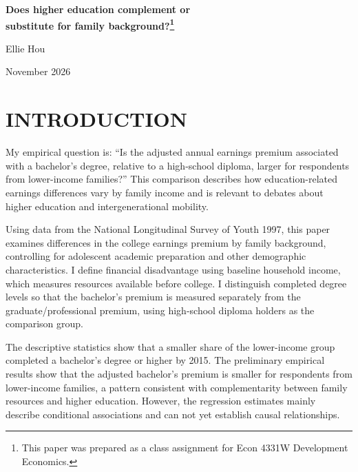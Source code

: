 \documentclass[12pt,letterpaper]{article}
\begin{document}
\hypersetup{pageanchor=false}
\begin{titlepage}
    \centering
    \singlespacing
    \renewcommand{\thefootnote}{\fnsymbol{footnote}}
    \vspace*{1.5in}

    {\Large\bfseries Does higher education complement or\\
    substitute for family background?\footnote{\normalfont This paper was prepared as a class assignment for Econ 4331W Development Economics.}\par}
    \vspace{\baselineskip}
    Ellie Hou\par
    November 2026\par

    \vfill
\end{titlepage}
\setcounter{footnote}{0}
\hypersetup{pageanchor=true}

\singlespacing
\raggedright

\section*{INTRODUCTION}
My empirical question is: ``Is the adjusted annual earnings premium associated with
a bachelor's degree, relative to a high-school diploma, larger for respondents
from lower-income families?'' This comparison describes how education-related
earnings differences vary by family income and is relevant to debates about higher
education and intergenerational mobility. \newline

Using data from the National Longitudinal Survey of Youth 1997, this paper examines differences
in the college earnings premium by family background, controlling for adolescent academic
preparation and other demographic characteristics. I define financial disadvantage using 
baseline household income, which measures resources available before college. 
I distinguish completed degree levels so that the bachelor's premium is measured separately 
from the graduate/professional premium, using high-school diploma holders as the comparison group.\newline

The descriptive statistics show that a smaller share of the lower-income group completed
a bachelor's degree or higher by 2015. The preliminary empirical results show that the 
adjusted bachelor's premium is smaller for respondents from lower-income families, a pattern 
consistent with complementarity between family resources and higher education.
However, the regression estimates mainly describe conditional associations and can not yet 
establish causal relationships.\newline
\end{document}
